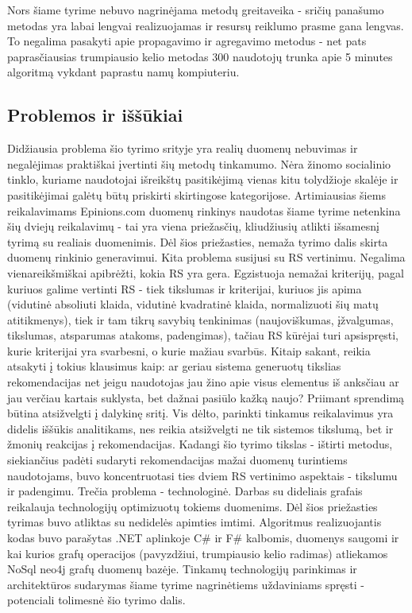\documentclass{VUMIFInfMagistrinis}
\begin{document}
\newline
\indent
Nors šiame tyrime nebuvo nagrinėjama metodų greitaveika - sričių panašumo metodas yra labai lengvai realizuojamas ir resursų reiklumo prasme gana lengvas. To negalima pasakyti apie propagavimo ir agregavimo metodus - net pats paprasčiausias trumpiausio kelio metodas 300 naudotojų trunka apie 5 minutes algoritmą vykdant paprastu namų kompiuteriu.

\subsection{Problemos ir iššūkiai}
\indent
Didžiausia problema šio tyrimo srityje yra realių duomenų nebuvimas ir negalėjimas praktiškai įvertinti šių metodų tinkamumo. Nėra žinomo socialinio tinklo, kuriame naudotojai išreikštų pasitikėjimą vienas kitu tolydžioje skalėje ir pasitikėjimai galėtų būtų priskirti skirtingose kategorijose. Artimiausias šiems reikalavimams Epinions.com duomenų rinkinys naudotas šiame tyrime netenkina šių dviejų reikalavimų - tai yra viena priežasčių, kliudžiusių atlikti išsamesnį tyrimą su realiais duomenimis. Dėl šios priežasties, nemaža tyrimo dalis skirta duomenų rinkinio generavimui.
\newline
\indent
Kita problema susijusi su RS vertinimu. Negalima vienareikšmiškai apibrėžti, kokia RS yra gera. Egzistuoja nemažai kriterijų, pagal kuriuos galime vertinti RS - tiek tikslumas ir kriterijai, kuriuos jis apima (vidutinė absoliuti klaida, vidutinė kvadratinė klaida, normalizuoti šių matų atitikmenys), tiek ir tam tikrų savybių tenkinimas (naujoviškumas, įžvalgumas, tikslumas, atsparumas atakoms, padengimas), tačiau RS kūrėjai turi apsispręsti, kurie kriterijai yra svarbesni, o kurie mažiau svarbūs. Kitaip sakant, reikia atsakyti į tokius klausimus kaip: ar geriau sistema generuotų tikslias rekomendacijas net jeigu naudotojas jau žino apie visus elementus iš anksčiau ar jau verčiau kartais suklysta, bet dažnai pasiūlo kažką naujo? Priimant sprendimą būtina atsižvelgti į dalykinę sritį. Vis dėlto, parinkti tinkamus reikalavimus yra didelis iššūkis analitikams, nes reikia atsižvelgti ne tik sistemos tikslumą, bet ir žmonių reakcijas į rekomendacijas. Kadangi šio tyrimo tikslas - ištirti metodus, siekiančius padėti sudaryti rekomendacijas mažai duomenų turintiems naudotojams, buvo koncentruotasi ties dviem RS vertinimo aspektais - tikslumu ir padengimu.
\newline
\indent
Trečia problema - technologinė. Darbas su dideliais grafais reikalauja technologijų optimizuotų tokiems duomenims. Dėl šios priežasties tyrimas buvo atliktas su nedidelės apimties imtimi. Algoritmus realizuojantis kodas buvo parašytas .NET aplinkoje C\# ir F\# kalbomis, duomenys saugomi ir kai kurios grafų operacijos (pavyzdžiui, trumpiausio kelio radimas) atliekamos NoSql neo4j grafų duomenų bazėje. Tinkamų technologijų parinkimas ir architektūros sudarymas šiame tyrime nagrinėtiems uždaviniams spręsti - potenciali tolimesnė šio tyrimo dalis.
\end{document}

